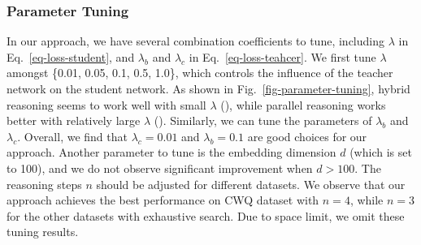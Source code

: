\subsubsection{Parameter Tuning} 
In our approach, we have several combination coefficients to tune, including $\lambda$ in Eq.~\ref{eq-loss-student}, and $\lambda_b$ and $\lambda_c$ in Eq.~\ref{eq-loss-teahcer}. We first tune $\lambda$ amongst \{0.01, 0.05, 0.1, 0.5, 1.0\}, which controls the influence of the teacher network on the student network. 
As shown in Fig.~\ref{fig-parameter-tuning},  hybrid reasoning seems to work
well with small $\lambda$ (), while parallel reasoning works better with relatively large $\lambda$ (). 
Similarly, we can tune the parameters of $\lambda_b$ and $\lambda_c$.
Overall, we find that  $\lambda_c=0.01$  and $\lambda_b=0.1$ are good choices for our approach. Another parameter to tune is the embedding dimension $d$ (which is set to 100), and we do not observe significant improvement when $d>100$. 
The reasoning steps $n$ should be adjusted for different datasets. We observe that our approach achieves the best performance on CWQ dataset with $n=4$, while $n=3$ for the other datasets with exhaustive search. Due to space limit, we omit these tuning results. 













